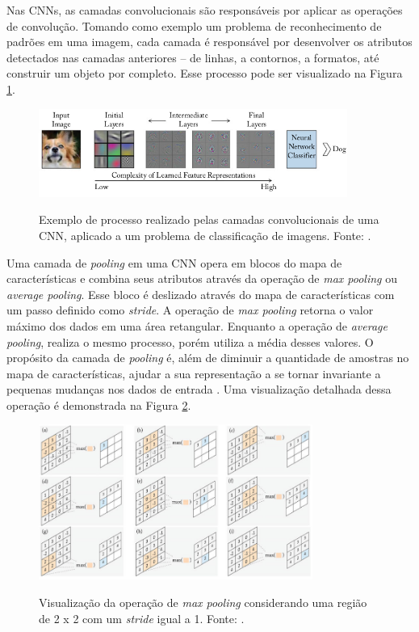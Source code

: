 Nas CNNs, as camadas convolucionais são responsáveis por aplicar as operações de convolução. Tomando como exemplo um problema de reconhecimento de padrões em uma imagem, cada camada é responsável por desenvolver os atributos detectados nas camadas anteriores -- de linhas, a contornos, a formatos, até construir um objeto por completo. Esse processo pode ser visualizado na Figura \ref{fig:camadas-convolucionais}. 

\begin{figure}[h!]
\centering
\caption{Exemplo de processo realizado pelas camadas convolucionais de uma CNN, aplicado a um problema de classificação de imagens. Fonte: \cite{khan}.}
\includegraphics[width=0.9\textwidth]{imgs/camadas-convolucionais}
\label{fig:camadas-convolucionais}
\end{figure}


Uma camada de \emph{pooling} em uma CNN opera em blocos do mapa de características e combina seus atributos através da operação de \emph{max pooling} ou \emph{average pooling}. Esse bloco é deslizado através do mapa de características com um passo definido como \emph{stride}. A operação de \emph{max pooling} retorna o valor máximo dos dados em uma área retangular. Enquanto a operação de \emph{average pooling}, realiza o mesmo processo, porém utiliza a média desses valores. O propósito da camada de \emph{pooling} é, além de diminuir a quantidade de amostras no mapa de características, ajudar a sua representação a se tornar invariante a pequenas mudanças nos dados de entrada \cite{khan, goodfellow}. Uma visualização detalhada dessa operação é demonstrada na Figura \ref{fig:pooling}.

\begin{figure}[h!]
  \centering
  \caption{Visualização da operação de \emph{max pooling} considerando uma região de 2 x 2 com um \emph{stride} igual a 1. Fonte: \cite{khan}.}
  \includegraphics[width=0.8\textwidth]{imgs/pooling}
  \label{fig:pooling}
\end{figure}

